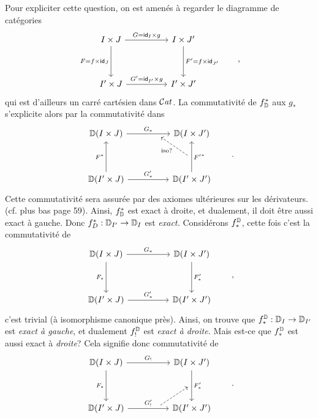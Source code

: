 
Pour expliciter cette question, on est amenés à regarder le diagramme de catégories
\[
\begin{tikzcd}[column sep=huge, row sep=huge]
I \times J \arrow[r, "G = \id_I \times g"] \arrow[d, "F = f \times \id_J"'] & I \times J' \arrow[d, "F' = f \times \id_{J'}"] \\
I' \times J \arrow[r, "G' = \id_{I'} \times g"] & I' \times J'
\end{tikzcd}
\qquad ,
\]
qui est d'ailleurs un carré cartésien dans $\mathcal{C}\mathit{at}$. La commutativité de $f^*_{\mathbb{D}}$ aux $g_*$ s'explicite alors par la commutativité dans
\[
\begin{tikzcd}[column sep=huge, row sep=huge]
\D(I \times J) \arrow[r, "G_*", ""{name=T, below, near end}] & \D(I \times J') \\
\D(I' \times J) \arrow[u, "F^*"] \arrow[r, "G'_*"] & \D(I' \times J') \arrow[u, "{F'}^*"', ""{name=R, left}]
\arrow[dashed, from=R, to=T, "\text{iso?}"]
\end{tikzcd}
\qquad .
\]
Cette commutativité sera assurée par des axiomes ultérieures sur les dérivateurs. (cf. plus %
bas page 59). Ainsi, $f^*_{\mathbb{D}}$ est exact à droite, et dualement, il doit être aussi exact à gauche. Donc $f^*_D : \mathbb{D}_{I'} \to \mathbb{D}_I$ est \textit{exact.} Considérons $f^{\mathbb{D}}_*$, %
cette fois c'est la commutativité de
\[
\begin{tikzcd}[column sep=huge, row sep=huge]
\D(I \times J) \arrow[r, "G_*"] \arrow[d, "F_*"'] & \D(I \times J') \arrow[d, "F'_*"] \\
\D(I' \times J) \arrow[r, "G'_*"] & \D(I' \times J')
\end{tikzcd}
\qquad ,
\]
c'est trivial (à isomorphisme canonique près). Ainsi, on
trouve que $f^{\mathbb{D}}_* : \mathbb{D}_I \to \mathbb{D}_{I'}$ est \textit{exact à gauche}, et dualement $f^{\mathbb{D}}_!$ est \textit{exact à droite.} Mais est-ce que $f^{\mathbb{D}}_*$ est aussi exact à \textit{droite}? Cela signifie donc commutativité de
\[
\begin{tikzcd}[column sep=huge, row sep=huge]
\D(I \times J) \arrow[r, "G_!"] \arrow[d, "F_*"'] & \D(I \times J') \arrow[d, "F'_*", ""{name=R2, left}] \\
\D(I' \times J) \arrow[r, "G'_!", ""{name=B, above, near end}] & \D(I' \times J')
\arrow[dashed, from=B, to=R2]
\end{tikzcd}
\qquad .
\]

